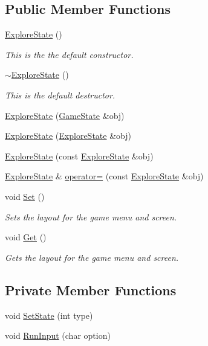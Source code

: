 \subsection*{Public Member Functions}
\begin{DoxyCompactItemize}
\item 
\hyperlink{classExploreState_ac10ad3cee219e8233a2c279392b70d52}{Explore\-State} ()
\begin{DoxyCompactList}\small\item\em This is the the default constructor. \end{DoxyCompactList}\item 
\hyperlink{classExploreState_a713fbeb296e929346e07ffe63c1af580}{$\sim$\-Explore\-State} ()
\begin{DoxyCompactList}\small\item\em This is the default destructor. \end{DoxyCompactList}\item 
\hyperlink{classExploreState_acb7330c9d04aeccdd2a9519b4d9fe232}{Explore\-State} (\hyperlink{classGameState}{Game\-State} \&obj)
\item 
\hyperlink{classExploreState_ab003f9b4c30fd15aae47c28fd9739114}{Explore\-State} (\hyperlink{classExploreState}{Explore\-State} \&obj)
\item 
\hyperlink{classExploreState_a4e0a1e3d3d17544b92b3e1ea31a274c4}{Explore\-State} (const \hyperlink{classExploreState}{Explore\-State} \&obj)
\item 
\hyperlink{classExploreState}{Explore\-State} \& \hyperlink{classExploreState_a010ecb3daf679e9ae2a97f4d760dda5b}{operator=} (const \hyperlink{classExploreState}{Explore\-State} \&obj)
\item 
void \hyperlink{classExploreState_a8fb38f9fca513b87d914d077a0f2652b}{Set} ()
\begin{DoxyCompactList}\small\item\em Sets the layout for the game menu and screen. \end{DoxyCompactList}\item 
void \hyperlink{classExploreState_ace76d7a24bcb85f6f0a0fe0d0e763e21}{Get} ()
\begin{DoxyCompactList}\small\item\em Gets the layout for the game menu and screen. \end{DoxyCompactList}\end{DoxyCompactItemize}
\subsection*{Private Member Functions}
\begin{DoxyCompactItemize}
\item 
void \hyperlink{classExploreState_a9c80dca4776d933ed892763d3f4bcad7}{Set\-State} (int type)
\item 
void \hyperlink{classExploreState_a8cd0a8ff2ca053a68f57f1eb73c3e4b9}{Run\-Input} (char option)
\end{DoxyCompactItemize}
